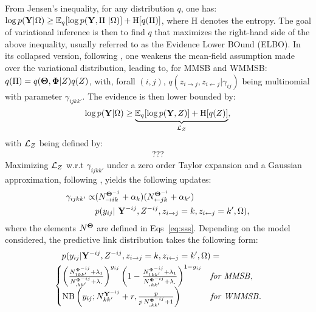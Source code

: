 From Jensen's inequality, for any distribution $q$, one has: $\log p({\mathbf{Y}} | \Omega) \ge \mathbb{E}_{q}[\log p({\mathbf{Y}}, \Pi\ | \Omega)] + \textrm{H}[q(\Pi)]$,
where $\textrm{H}$ denotes the entropy. The goal of variational inference is then to find $q$ that maximizes the right-hand side of the above inequality, usually referred to as the Evidence Lower BOund (ELBO). In its collapsed version, following \cite{teh2007collapsed}, one weakens the mean-field assumption made over the variational distribution, leading to, for MMSB and WMMSB: $q(\Pi) = q({\boldsymbol{\Theta}}, {\boldsymbol{\Phi}} | Z) q(Z)$,
with, forall $(i,j)$, $q(z_{i \rightarrow j}, z_{i \leftarrow j}|\gamma_{ij})$ being multinomial with parameter $\gamma_{ijkk'}$. The evidence is then lower bounded by:
%
\begin{equation*}
\log p({\mathbf{Y}}|\Omega) \geq \underbrace{\mathbb{E}_{q}[\log p({\mathbf{Y}}, Z)] + \textrm{H}[q(Z)]}_{\mathcal{L}_Z},
\end{equation*}
%
with $\mathcal{L}_Z$ being defined by:
%
\begin{align*}
???
\end{align*}
%
Maximizing $\mathcal{L}_Z$ w.r.t $\gamma_{ijkk'}$ under a zero order Taylor expansion and a Gaussian approximation, following \cite{teh2007collapsed,asuncion2009smoothing}, yields the following updates:
%
\begin{align} \label{eq:maximization}
\gamma_{ijkk'} \propto &(N_{\rightarrow ik}^{{\Bs{\Theta}}^{-j}} + \alpha_k) (N_{\leftarrow jk}^{{\Bs{\Theta}}^{-i}} + \alpha_{k'}) \nonumber\\
  &p(y_{ij} | {\B{Y}}^{-ij}, Z^{- ij}, \zij=k, \zji=k',\Omega),
\end{align}
%
where the elements $N^{{\boldsymbol{\Theta}}}$ are defined in Eqs~\eqref{eq:sss}. Depending on the model considered, the predictive link distribution
takes the following form:
%
\begin{align*}
&\quad p(y_{ij} | {\B{Y}}^{-ij}, Z^{- ij}, \zij=k, \zji=k',\Omega) = \\
&\begin{cases}
    \left( \frac{ N^{{\Bs{\Phi}}^{-ij}}_{1 kk'} + \lambda_1}{N^{{\Bs{\Phi}}^{-ij}}_{\bm{.}kk'} + \lambda_{\bm{.}}}\right)^{y_{ij}} \left( 1- \frac{ N^{{\Bs{\Phi}}^{-ij}}_{1 kk'} + \lambda_1}{N^{{\Bs{\Phi}}^{-ij}}_{\bm{.}kk'} + \lambda_{\bm{.}}}\right)^{1-y_{ij}}  & \textrm{\textit{for MMSB}}, \\
    \mathrm{NB}\left(y_{ij}; N^{{\B{Y}}^{-ij}}_{kk'} + r, \frac{p}{p\,N^{{\Bs{\Phi}}^{-ij}}_{\bm{.}kk'} + 1} \right) & \textrm{\textit{for WMMSB}}. %
\end{cases}
\end{align*}

